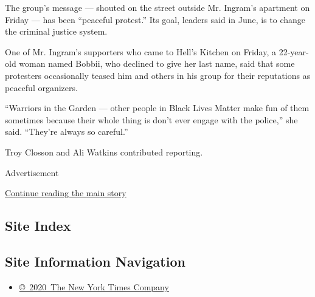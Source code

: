 The group's message --- shouted on the street outside Mr. Ingram's
apartment on Friday --- has been ``peaceful protest.'' Its goal, leaders
said in June, is to change the criminal justice system.

One of Mr. Ingram's supporters who came to Hell's Kitchen on Friday, a
22-year-old woman named Bobbii, who declined to give her last name, said
that some protesters occasionally teased him and others in his group for
their reputations as peaceful organizers.

``Warriors in the Garden --- other people in Black Lives Matter make fun
of them sometimes because their whole thing is don't ever engage with
the police,'' she said. ``They're always so careful.''

Troy Closson and Ali Watkins contributed reporting.

Advertisement

\protect\hyperlink{after-bottom}{Continue reading the main story}

\hypertarget{site-index}{%
\subsection{Site Index}\label{site-index}}

\hypertarget{site-information-navigation}{%
\subsection{Site Information
Navigation}\label{site-information-navigation}}

\begin{itemize}
\tightlist
\item
  \href{https://help.nytimes3xbfgragh.onion/hc/en-us/articles/115014792127-Copyright-notice}{©~2020~The
  New York Times Company}
\end{itemize}

